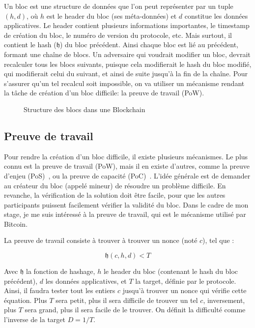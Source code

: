     Un bloc est une structure de données que l'on peut représenter par un tuple
    $(h, d)$, où $h$ est le header du bloc (ses méta-données) et $d$ constitue
    les données applicatives. Le header contient plusieurs informations
    importantes, le timestamp de création du bloc, le numéro de version du
    protocole, etc. Mais surtout, il contient le hash ($\mathfrak{h}$) du bloc
    précédent. Ainsi chaque bloc est lié au précédent, formant une chaîne de
    blocs. Un adversaire qui voudrait modifier un bloc, devrait recalculer tous
    les blocs suivants, puisque cela modifierait le hash du bloc modifié, qui
    modifierait celui du suivant, et ainsi de suite jusqu'à la fin de la chaîne.
    Pour s'assurer qu'un tel recalcul soit impossible, on va utiliser un
    mécanisme rendant la tâche de création d'un bloc difficile: la preuve de
    travail (PoW).

    \vspace{1cm}
    \begin{figure}[ht]
        \centering
        
        \caption{Structure des blocs dans une Blockchain}
        \label{fig:blocs}
    \end{figure}


    \subsection{Preuve de travail}\label{subsec:pow}

    Pour rendre la création d'un bloc difficile, il existe plusieurs mécanismes.
    Le plus connu est la preuve de travail (PoW), mais il en existe d'autres,
    comme la preuve d'enjeu (PoS)~\cite{PoS}, ou la preuve de capacité
    (PoC)~\cite{PoC}. L'idée générale est de demander au créateur du bloc
    (appelé mineur) de résoudre un problème difficile. En revanche, la
    vérification de la solution doit être facile, pour que les autres
    participants puissent facilement vérifier la validité du bloc. Dans le cadre
    de mon stage, je me suis intéressé à la preuve de travail, qui est le
    mécanisme utilisé par Bitcoin.

    La preuve de travail consiste à trouver à trouver un nonce (noté $c$), tel
    que :

    \begin{equation}
        \mathfrak{h}(c, h, d) < T
    \end{equation}

    Avec $\mathfrak{h}$ la fonction de hashage, $h$ le header du bloc (contenant
    le hash du bloc précédent), $d$ les données applicatives, et $T$ la target,
    définie par le protocole. Ainsi, il faudra tester tout les entiers $c$
    jusqu'à trouver un nonce qui vérifie cette équation. Plus $T$ sera petit,
    plus il sera difficile de trouver un tel $c$, inversement, plus $T$ sera
    grand, plus il sera facile de le trouver. On définit la difficulté comme
    l'inverse de la target $D = 1/T$.

